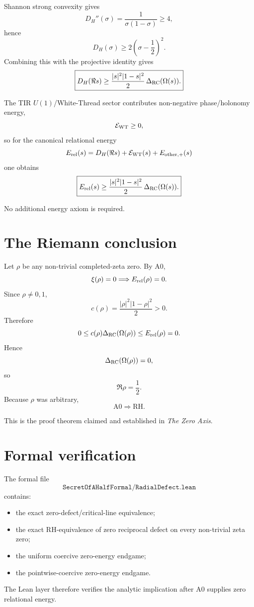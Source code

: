 Shannon strong convexity gives
\[
D_H''(\sigma)
=
\frac1{\sigma(1-\sigma)}
\ge4,
\]
hence
\[
D_H(\sigma)
\ge
2\left(\sigma-\frac12\right)^2.
\]
Combining this with the projective identity gives
\[
\boxed{
D_H(\Re s)
\ge
\frac{|s|^2|1-s|^2}{2}\,
\Delta_{\rm RC}(\Omega(s)).
}
\]

The TIR \(U(1)\)/White-Thread sector contributes non-negative phase/holonomy
energy,
\[
\mathcal E_{\rm WT}\ge0,
\]
so for the canonical relational energy
\[
E_{\rm rel}(s)
=
D_H(\Re s)
+
\mathcal E_{\rm WT}(s)
+
E_{\rm other,+}(s)
\]
one obtains
\[
\boxed{
E_{\rm rel}(s)
\ge
\frac{|s|^2|1-s|^2}{2}\,
\Delta_{\rm RC}(\Omega(s)).
}
\]

No additional energy axiom is required.

\section*{The Riemann conclusion}

Let \(\rho\) be any non-trivial completed-zeta zero. By A0,
\[
\xi(\rho)=0
\Longrightarrow
E_{\rm rel}(\rho)=0.
\]
Since \(\rho\ne0,1\),
\[
c(\rho)
=
\frac{|\rho|^2|1-\rho|^2}{2}
>0.
\]
Therefore
\[
0
\le
c(\rho)\Delta_{\rm RC}(\Omega(\rho))
\le
E_{\rm rel}(\rho)
=
0.
\]
Hence
\[
\Delta_{\rm RC}(\Omega(\rho))=0,
\]
so
\[
\Re\rho=\frac12.
\]
Because \(\rho\) was arbitrary,
\[
\boxed{\mathrm{A0}\Longrightarrow\mathrm{RH}.}
\]

This is the proof theorem claimed and established in \emph{The Zero Axis}.

\section*{Formal verification}

The formal file
\[
\texttt{SecretOfAHalfFormal/RadialDefect.lean}
\]
contains:

\begin{itemize}
  \item the exact zero-defect/critical-line equivalence;
  \item the exact RH-equivalence of zero reciprocal defect on every non-trivial
  zeta zero;
  \item the uniform coercive zero-energy endgame;
  \item the pointwise-coercive zero-energy endgame.
\end{itemize}

The Lean layer therefore verifies the analytic implication after A0 supplies
zero relational energy.

